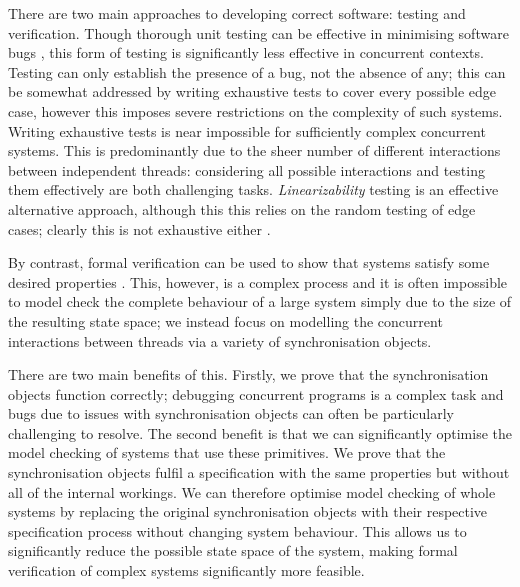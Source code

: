 There are two main approaches to developing correct software: testing and verification. Though thorough unit testing can be effective in minimising software bugs \cite{MicroTest}, this form of testing is significantly less effective in concurrent contexts. Testing can only establish the presence of a bug, not the absence of any; this can be somewhat addressed by writing exhaustive tests to cover every possible edge case, however this imposes severe restrictions on the complexity of such systems. Writing exhaustive tests is near impossible for sufficiently complex concurrent systems. This is predominantly due to the sheer number of different interactions between independent threads: considering all possible interactions and testing them effectively are both challenging tasks.
\emph{Linearizability} testing is an effective alternative approach, although this this relies on the random testing of edge cases; clearly this is not exhaustive either \cite{LoweLin}.

By contrast, formal verification can be used to show that systems satisfy some desired properties \cite{PrinciplesOfModelChecking}. This, however, is a complex process and it is often impossible to model check the complete behaviour of a large system simply due to the size of the resulting state space; we instead focus on modelling the concurrent interactions between threads via a variety of synchronisation objects. 

There are two main benefits of this. Firstly, we prove that the synchronisation objects function correctly; debugging concurrent programs is a complex task and bugs due to issues with synchronisation objects can often be particularly challenging to resolve. The second benefit is that we can significantly optimise the model checking of systems that use these primitives. We prove that the synchronisation objects fulfil a specification with the same properties but without all of the internal workings. We can therefore optimise model checking of whole systems by replacing the original synchronisation objects with their respective specification process without changing system behaviour. This allows us to significantly reduce the possible state space of the system, making formal verification of complex systems significantly more feasible.


